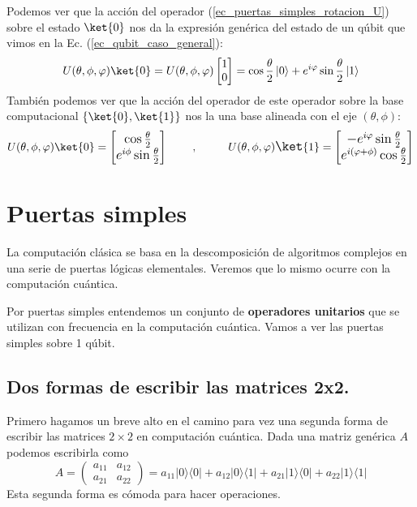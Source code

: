 \documentclass[a4paper,11pt]{book} %
\numberwithin{equation}{chapter}
\def\lp{\left(}
\def\rp{\right)}
\def\lch{\left\{}
\def\rch{\right\}}
\newcommand{\ketbra}[2]{| #1\rangle \! \langle #2|}
\begin{document}
Podemos ver que la acción del operador (\ref{ec_puertas_simples_rotacion_U}) sobre el estado $\ket{0}$ nos da la expresión genérica del estado de un qúbit que vimos en la Ec. (\ref{ec_qubit_caso_general}):
	\begin{equation}
	U (\theta, \phi, \varphi) \ket{0} = 
	U (\theta, \phi, \varphi) \begin{bmatrix} 1 \\ 0 \end{bmatrix} = 
	 \cos{\frac{\theta}{2}}\, |0\rangle + e^{i\varphi}\sin{\frac{\theta}{2}}\,|1\rangle
	\end{equation}
También podemos ver que la acción del operador de este operador sobre la base computacional $\lch \ket{0}, \ket{1} \rch$ nos la una base alineada con el eje $(\theta, \phi)$:
	\begin{equation}
	U(\theta,\phi,\varphi) \ket{0} = 
		\large{\begin{bmatrix} \cos \frac{\theta}{2}  \\ e^{i\phi} \sin \frac{\theta}{2} \end{bmatrix} }
	~~~~~~,~~~~~~~
	U(\theta,\phi,\varphi) \ket{1} = 
		\large{\begin{bmatrix} -e^{i\varphi}\sin \frac{\theta}{2} \\ e^{i(\varphi + \phi)} \cos \frac{\theta}{2} \end{bmatrix} }
	\end{equation}

    \section{Puertas simples}

La computación clásica se basa en la descomposición de algoritmos complejos en una serie de puertas lógicas elementales. Veremos que lo mismo ocurre con la computación cuántica.  

Por puertas simples entendemos un conjunto de \textbf{operadores unitarios} que se utilizan con frecuencia en la computación cuántica. Vamos a ver las puertas simples sobre 1 qúbit. 

		\subsection{Dos formas de escribir las matrices 2x2.}   

Primero hagamos un breve alto en el camino para vez una segunda forma de escribir las matrices $2\times2$ en computación cuántica. Dada una matriz genérica $A$ podemos escribirla como
\begin{equation}
A = \lp \begin{matrix}
a_{11} & a_{12} \\
a_{21} & a_{22}
\end{matrix} \rp = 
a_{11} \ketbra{0}{0} + a_{12} \ketbra{0}{1} +  a_{21} \ketbra{1}{0} +  a_{22} \ketbra{1}{1} 
\end{equation}
Esta segunda forma es cómoda para hacer operaciones. 
\end{document}
